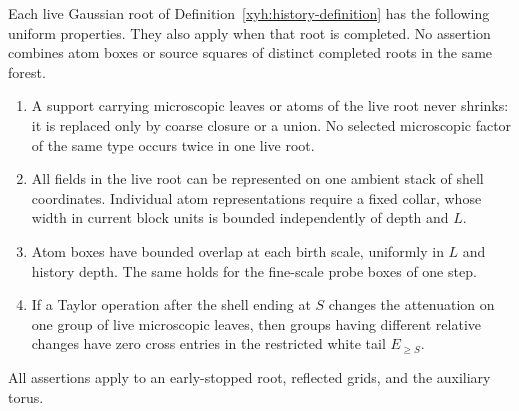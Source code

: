 \begin{lemma}\label{xyh:history}
Each live Gaussian root of Definition~\ref{xyh:history-definition} has
the following uniform properties. They also apply when that root is
completed. No assertion combines atom boxes or source squares of distinct
completed roots in the same forest.
\begin{enumerate}[label=\textup{(\alph*)}]
\item A support carrying microscopic leaves or atoms of the live root never shrinks: it is
replaced only by coarse closure or a union. No selected microscopic
factor of the same type occurs twice in one live root.
\item All fields in the live root can be represented on one ambient
stack of shell coordinates. Individual atom representations require a
fixed collar, whose width in current block units is bounded independently
of depth and $L$.
\item Atom boxes have bounded overlap at each birth scale, uniformly in
$L$ and history depth. The same holds for the fine-scale probe boxes of
one step.
\item If a Taylor operation after the shell ending at $S$ changes the
attenuation on one group of live microscopic leaves, then groups having
different relative changes have zero cross entries in the restricted
white tail $E_{\ge S}$.
\end{enumerate}
All assertions apply to an early-stopped root, reflected grids, and
the auxiliary torus.
\end{lemma}

